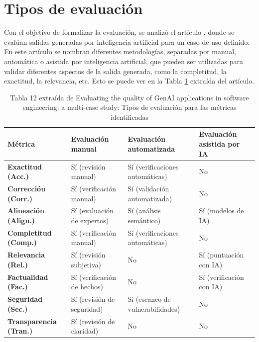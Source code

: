 \section{Tipos de evaluación}
\label{central-enfoque}

Con el objetivo de formalizar la evaluación, se analizó el artículo \cite{yu2026evaluating_genai_quality_multicase}, donde se evalúan salidas generadas por inteligencia artificial para un caso de uso definido. En este artículo se nombran diferentes metodologías, separadas por manual, automática o asistida por inteligencia artificial, que pueden ser utilizadas para validar diferentes aspectos de la salida generada, como la completitud, la exactitud, la relevancia, etc. Esto se puede ver en la Tabla \ref{table:aritculo-eval} extraída del artículo.

\begin{table}[h!]
\centering
\begin{tabular}{|p{2.5cm} | p{2.5cm} | p{2.5cm} | p{2.5cm}|}
\hline
\textbf{Métrica} & \textbf{Evaluación manual} & \textbf{Evaluación automatizada} & \textbf{Evaluación asistida por IA} \\
\hline

\textbf{Exactitud (Acc.)} & 
Sí (revisión manual) & 
Sí (verificaciones automáticas) & 
No \\

\textbf{Corrección (Corr.)} & 
Sí (verificación manual) & 
Sí (validación automatizada) & 
No \\

\textbf{Alineación (Align.)} & 
Sí (evaluación de expertos) & 
Sí (análisis semántico) & 
Sí (modelos de IA) \\

\textbf{Completitud (Comp.)} & 
Sí (verificación manual) & 
Sí (verificaciones automáticas) & 
No \\

\textbf{Relevancia (Rel.)} & 
Sí (revisión subjetiva) & 
No & 
Sí (puntuación con IA) \\

\textbf{Factualidad (Fac.)} & 
Sí (verificación de hechos) & 
No & 
Sí (verificación con IA) \\

\textbf{Seguridad (Sec.)} & 
Sí (revisión de seguridad) & 
Sí (escaneo de vulnerabilidades) & 
No \\

\textbf{Transparencia (Tran.)} & 
Sí (revisión de claridad) & 
No & 
No \\

\hline
\end{tabular}
\caption{Tabla 12 extraída de Evaluating the quality of GenAI applications in software
engineering: a multi-case study: Tipos de evaluación para las métricas identificadas}
\label{table:aritculo-eval}
\end{table}

